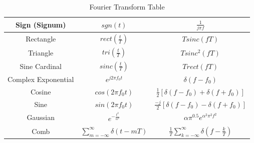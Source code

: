\begin{enumerate}
\begin{table}[h]
\begin{tabular}{|c|c|c|}
        \hline
        Sign (Signum) & $sgn(t)$ & $\displaystyle \frac{1}{j\pi f}$ \\
        \hline
        Rectangle & $rect(\frac{t}{T})$ & $Tsinc(fT)$ \\
        \hline
        Triangle & $tri(\frac{t}{T})$ & $Tsinc^2(fT)$ \\
        \hline
        Sine Cardinal & $sinc(\frac{t}{T})$ & $Trect(fT)$ \\
        \hline
        Complex Exponential & $e^{j2\pi f_0 t}$ & $\delta(f-f_0)$ \\
        \hline
        Cosine & $cos(2\pi f_0t)$ & $\displaystyle \frac{1}{2}[\delta(f-f_0)+\delta(f+f_0)]$\\
        \hline
        Sine & $sin(2\pi f_0t)$ & $\displaystyle \frac{-j}{2}[\delta(f-f_0)-\delta(f+f_0)]$\\
        \hline
        Gaussian & $\displaystyle e^{-\frac{t^2}{\alpha^2}}$ & $\displaystyle \alpha \pi^{0.5}e^{\alpha^2\pi^2f^2}$ \\
        \hline
        Comb & $\displaystyle \sum^{\infty}_{m=-\infty}\delta(t-mT)$ & $\displaystyle \frac{1}{T}\sum^{\infty}_{k=-\infty}\delta(f-\frac{k}{T})$\\
        \hline
        \end{tabular}
        \caption{Fourier Transform Table}
        \label{tab:my_label}
    \end{table}
\end{enumerate}
